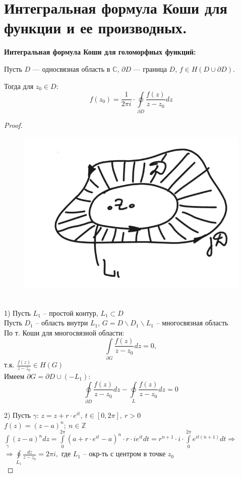 \newpage
\section{Интегральная формула Коши для функции и ее производных.}


\textbf{Интегральная формула Коши для голоморфных функций:}

Пусть $D$ --- односвязная область в $\mathbb{C}$, $\partial D$ --- граница $D$, $f\in H(D\cup \partial D).$

Тогда для $z_0 \in D$:
$$f(z_0)=\frac{1}{2\pi i} \cdot \oint\limits_{\partial D} \frac{f(z)}{z-z_0}dz$$

\begin{proof}
    \ \\
    \begin{figure}[!ht]
        \includegraphics[scale=0.6]{answers/img/ans9.png}
    \end{figure}\\
    1) Пусть $L_1$ -- простой контур, $L_1 \subset D$\\
    Пусть $D_1$ -- область внутри $L_1$, $G=D\backslash D_1\backslash L_1$ -- многосвязная область\\
    По т. Коши для многосвязной области:
    $$\int\limits_{\partial G}\frac{f(z)}{z-z_0}dz=0,$$
    т.к. $\frac{f(z)}{z-z_0} \in H(G)$\\
    Имеем $\partial G = \partial D \cup (-L_1)$:\\
    $$\oint\limits_{\partial D}\frac{f(z)}{z-z_0}dz-\oint\limits_{L}\frac{f(z)}{z-z_0}dz=0$$

    2) Пусть $\gamma: \, z=z+r\cdot e^{it}, \ t\in[0, 2\pi], \ r>0$\\
    $f(z)=(z-a)^n; \ n\in \mathbb{Z}$\\
    $\int\limits_{\gamma}(z-a)^n dz = \int\limits_0^{2\pi} (a+r\cdot e^{it}-a)^n\cdot r\cdot ie^{it}dt = r^{n+1}\cdot i \cdot \int\limits_0^{2\pi} e^{it(n+1)}dt \Rightarrow$\\
    $\Rightarrow \oint\limits_{L_1}\frac{dz}{z-z_0} = 2\pi i,$
    где $L_1$ -- окр-ть с центром в точке $z_0$\\


\end{proof}
